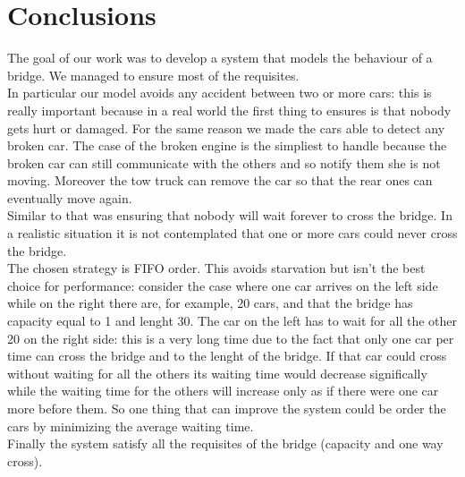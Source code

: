 \chapter{Conclusions}\label{ch:conclusions}

The goal of our work was to develop a system that models the behaviour of a bridge. We managed to ensure
most of the requisites.\\ In particular our model avoids any accident between two or more cars: this is 
really important because in a real world the first thing to ensures is that nobody gets hurt or damaged. 
For the same reason we made the cars able to detect any broken car. The case of the broken engine is the simpliest
to handle because the broken car can still communicate with the others and so notify them she is not moving.
Moreover the tow truck can remove the car so that the rear ones can eventually move again.\\ Similar to that
was ensuring that nobody will wait forever to cross the bridge. In a realistic situation it is not contemplated
that one or more cars could never cross the bridge.\\
The chosen strategy is FIFO order. This avoids starvation but isn't the best choice for performance: consider
the case where one car arrives on the left side while on the right there are, for example, 20 cars, and that the bridge
has capacity equal to 1 and lenght 30. The car on the left has to wait for all the other 20 on the right side: this 
is a very long time due to the fact that only one car per time can cross the bridge and to the lenght of the bridge.
If that car could cross without waiting for all the others its waiting time would decrease significally while
the waiting time for the others will increase only as if there were one car more before them. So one thing 
that can improve the system could be order the cars by minimizing the average waiting time.\\
Finally the system satisfy all the requisites of the bridge (capacity and one way cross).
